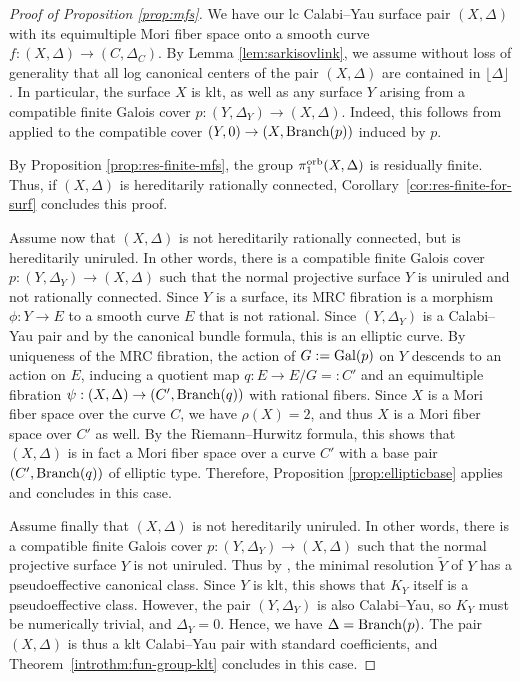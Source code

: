 \documentclass{amsart}
\theoremstyle{definition}
\theoremstyle{remark}
\numberwithin{equation}{section}
\begin{document}
\begin{proof}[Proof of Proposition \ref{prop:mfs}]
We have our lc Calabi--Yau surface pair $(X,\Delta)$ with its equimultiple Mori fiber space onto a smooth curve
$f\colon (X,\Delta) \rightarrow (C,\Delta_C)$. By Lemma \ref{lem:sarkisovlink}, we assume without loss of generality that all log canonical centers of the pair $(X,\Delta)$ are contained in $\lfloor\Delta\rfloor$. In particular, the surface $X$ is klt, as well as any surface $Y$ arising from a compatible finite Galois cover $p:(Y,\Delta_Y)\to (X,\Delta)$. Indeed, this follows from \cite[Proposition 5.20]{KM98} applied to the compatible cover $(Y,0)\to (X,{\rm Branch}(p))$ induced by $p$.

By Proposition \ref{prop:res-finite-mfs}, the group $\pi_1^{\rm orb}(X,\Delta)$ is residually finite. Thus, if $(X,\Delta)$ is hereditarily rationally connected, Corollary~\ref{cor:res-finite-for-surf} concludes this proof.

Assume now that $(X,\Delta)$ is not hereditarily rationally connected, but is hereditarily uniruled. In other words, there is a compatible finite Galois cover $p\colon (Y,\Delta_Y)\rightarrow (X,\Delta)$ such that the normal projective surface $Y$ is uniruled and not rationally connected. Since $Y$ is a surface, its MRC fibration is a morphism
$\phi: Y\to E$ to a smooth curve $E$ that is not rational. Since $(Y,\Delta_Y)$ is a Calabi--Yau pair and by the canonical bundle formula, this is an elliptic curve. By uniqueness of the MRC fibration, the action of $G:={\rm Gal}(p)$ on $Y$ descends to an action on $E$, inducing a quotient map $q:E\to E/G=:C'$ and an equimultiple fibration $\psi: (X,\Delta)\to (C',{\rm Branch}(q))$ with rational fibers. Since $X$ is a Mori fiber space over the curve $C$, we have $\rho(X)=2$, and thus $X$ is a Mori fiber space over $C'$ as well. By the Riemann--Hurwitz formula, this shows that $(X,\Delta)$ is in fact a Mori fiber space over a curve $C'$ with a base pair $(C',{\rm Branch}(q))$ of elliptic type. Therefore, Proposition \ref{prop:ellipticbase} applies and concludes in this case.

Assume finally that $(X,\Delta)$ is not hereditarily uniruled. In other words, there is a compatible finite Galois cover $p\colon (Y,\Delta_Y)\rightarrow (X,\Delta)$ such that the normal projective surface $Y$ is not uniruled. Thus by \cite[Corollary 0.3]{BDPP13}, the minimal resolution $\tilde{Y}$ of $Y$ has a pseudoeffective canonical class. Since $Y$ is klt, this shows that $K_Y$ itself is a pseudoeffective class. However, the pair $(Y,\Delta_Y)$ is also Calabi--Yau, so $K_Y$ must be numerically trivial, and $\Delta_Y = 0$. Hence, we have $\Delta={\rm Branch}(p)$. The pair $(X,\Delta)$ is thus a klt Calabi--Yau pair with standard coefficients, and Theorem~\ref{introthm:fun-group-klt} concludes in this case. 
\end{proof}
\end{document}
